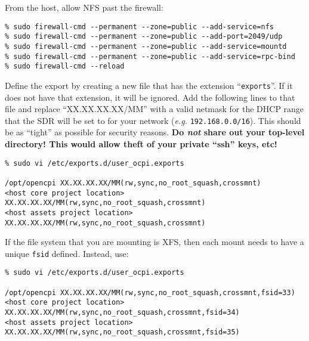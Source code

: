From the host, allow NFS past the firewall:
\begin{verbatim}
% sudo firewall-cmd --permanent --zone=public --add-service=nfs
% sudo firewall-cmd --permanent --zone=public --add-port=2049/udp
% sudo firewall-cmd --permanent --zone=public --add-service=mountd
% sudo firewall-cmd --permanent --zone=public --add-service=rpc-bind
% sudo firewall-cmd --reload
\end{verbatim}

Define the export by creating a new file that has the extension ``\texttt{exports}''. If it does not have that extension, it will be ignored.  Add the following lines to that file and replace ``XX.XX.XX.XX/MM'' with a valid netmask for the DHCP range that the SDR will be set to for your network (\textit{e.g.} \texttt{192.168.0.0/16}).
This should be as ``tight'' as possible for security reasons. \textbf{Do \textit{not} share out your top-level directory! This would allow theft of your private ``ssh'' keys, etc!} %

\begin{verbatim}
% sudo vi /etc/exports.d/user_ocpi.exports

/opt/opencpi XX.XX.XX.XX/MM(rw,sync,no_root_squash,crossmnt)
<host core project location> XX.XX.XX.XX/MM(rw,sync,no_root_squash,crossmnt)
<host assets project location> XX.XX.XX.XX/MM(rw,sync,no_root_squash,crossmnt)
\end{verbatim}

If the file system that you are mounting is XFS, then each mount needs to have a unique \texttt{fsid} defined. Instead, use:
\begin{verbatim}
% sudo vi /etc/exports.d/user_ocpi.exports

/opt/opencpi XX.XX.XX.XX/MM(rw,sync,no_root_squash,crossmnt,fsid=33)
<host core project location> XX.XX.XX.XX/MM(rw,sync,no_root_squash,crossmnt,fsid=34)
<host assets project location> XX.XX.XX.XX/MM(rw,sync,no_root_squash,crossmnt,fsid=35)
\end{verbatim}

